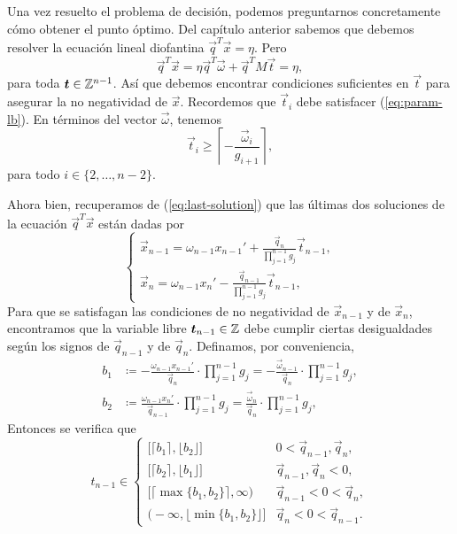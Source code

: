 Una vez resuelto el problema de decisión, podemos preguntarnos concretamente cómo obtener el punto
óptimo. Del capítulo anterior sabemos que debemos resolver la ecuación lineal diofantina
$\vec{q}^T\vec{x} = \eta$. Pero
\begin{equation*}
	\vec{q}^T\vec{x} = \eta\vec{q}^T\vec{\omega} + \vec{q}^TM\vec{t} = \eta,
\end{equation*}
para toda $\boldsymbol{t} \in \mathbb{Z}^{n-1}$. Así que debemos encontrar condiciones suficientes en $\vec{t}$
para asegurar la no negatividad de $\vec{x}$. Recordemos que $\vec{t}_i$ debe satisfacer
(\ref{eq:param-lb}). En términos del vector $\vec{\omega}$, tenemos
\begin{equation}
	\label{eq:vect-param-lb}
	\vec{t}_i \geq \left\lceil -\frac{\vec{\omega}_i}{g_{i+1}} \right\rceil,
\end{equation}
para todo $i \in \lbrace 2, \ldots, n - 2\rbrace$.

Ahora bien, recuperamos de (\ref{eq:last-solution}) que las últimas dos soluciones de la ecuación
$\vec{q}^T\vec{x}$ están dadas por
\begin{equation}
	\begin{cases}
		\vec{x}_{n-1} = \omega_{n-1}x_{n-1}' + \frac{\vec{q}_n}{\prod_{j=1}^{n-1}g_j}\vec{t}_{n-1}, \\
		\vec{x}_n = \omega_{n-1}x_n' - \frac{\vec{q}_{n-1}}{\prod_{j=1}^{n-1}g_j}\vec{t}_{n-1},
	\end{cases}
\end{equation}
Para que se satisfagan las condiciones de no negatividad de $\vec{x}_{n-1}$ y de $\vec{x}_n$,
encontramos que la variable libre $\boldsymbol{t}_{n-1} \in \mathbb{Z}$ debe cumplir ciertas desigualdades según los
signos de $\vec{q}_{n-1}$ y de $\vec{q}_n$. Definamos, por conveniencia,
\begin{subequations}
	\label{eq:lr-bounds}
	\begin{align}
		b_1 &\coloneq -\frac{\omega_{n-1}x_{n-1}'}{\vec{q}_n} \cdot \prod_{j=1}^{n-1}g_j
		= -\frac{\vec{\omega}_{n-1}}{\vec{q}_n} \cdot \prod_{j=1}^{n-1}g_j, \\
		b_2 &\coloneq \frac{\omega_{n-1}x_{n}'}{\vec{q}_{n-1}} \cdot \prod_{j=1}^{n-1}g_j
		= \frac{\vec{\omega}_{n}}{\vec{q}_n} \cdot \prod_{j=1}^{n-1}g_j,
	\end{align}
\end{subequations}
Entonces se verifica que
\begin{equation}
	\label{eq:feasible-param}
	t_{n-1} \in 
	\begin{cases}
		\big[ \lceil b_1 \rceil, \lfloor b_2 \rfloor \big] &  0 < \vec{q}_{n-1}, \vec{q}_n, \\
		\big[ \lceil b_2 \rceil, \lfloor b_1 \rfloor \big] &  \vec{q}_{n-1}, \vec{q}_n < 0, \\
		\big[ \lceil \max\lbrace b_1 ,  b_2 \rbrace \rceil, \infty \big) &  \vec{q}_{n-1}
		< 0 < \vec{q}_n, \\
		\big( -\infty, \lfloor \min\lbrace b_1, b_2\rbrace \rfloor \big] &  \vec{q}_n < 0
		< \vec{q}_{n-1}.
	\end{cases}
\end{equation}

